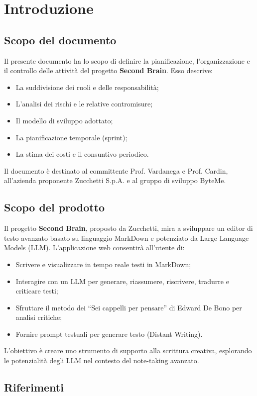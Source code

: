\documentclass[11pt,a4paper]{article}
\begin{document}
\section{Introduzione}
\subsection{Scopo del documento}
Il presente documento ha lo scopo di definire la pianificazione, l’organizzazione e il controllo delle attività del progetto \textbf{Second Brain}. Esso descrive:
\begin{itemize}
    \item La suddivisione dei ruoli e delle responsabilità;
    \item L’analisi dei rischi e le relative contromisure;
    \item Il modello di sviluppo adottato;
    \item La pianificazione temporale (sprint);
    \item La stima dei costi e il consuntivo periodico.
\end{itemize}
Il documento è destinato al committente Prof. Vardanega e Prof. Cardin, all'azienda proponente Zucchetti S.p.A. e al gruppo di sviluppo ByteMe.

\subsection{Scopo del prodotto}
Il progetto \textbf{Second Brain}, proposto da Zucchetti, mira a sviluppare un editor di testo avanzato basato su linguaggio MarkDown e potenziato da Large Language Models (LLM). L’applicazione web consentirà all’utente di:
\begin{itemize}
    \item Scrivere e visualizzare in tempo reale testi in MarkDown;
    \item Interagire con un LLM per generare, riassumere, riscrivere, tradurre e criticare testi;
    \item Sfruttare il metodo dei “Sei cappelli per pensare” di Edward De Bono per analisi critiche;
    \item Fornire prompt testuali per generare testo (Distant Writing).
\end{itemize}
L’obiettivo è creare uno strumento di supporto alla scrittura creativa, esplorando le potenzialità degli LLM nel contesto del note-taking avanzato.

\subsection{Riferimenti}
\end{document}
